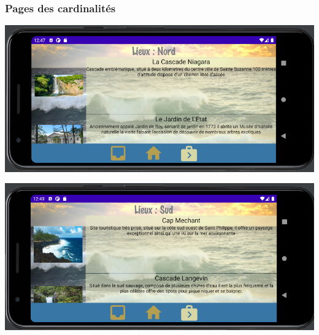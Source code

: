 \documentclass{article}
\begin{document}
{\color{purple}\subsubsection{Pages des cardinalités}}
\begin{minipage}{0.45\textwidth}
\includegraphics[width=\textwidth]{Lieux_nord_p}
\end{minipage}
\hfill
\begin{minipage}{0.45\textwidth}
\includegraphics[width=\textwidth]{Lieux_sud_p}
\end{minipage}
\end{document}
